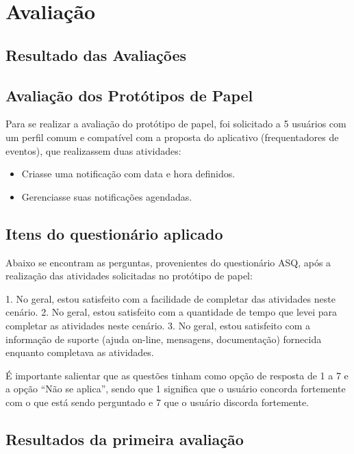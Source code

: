 \chapter{Avaliação}

  \section{Resultado das Avaliações}
  
     \section{Avaliação dos Protótipos de Papel}
     
     Para se realizar a avaliação do protótipo de papel, foi solicitado a 5 usuários com um perfil comum e compatível com a proposta do aplicativo 
  (frequentadores de eventos), que realizassem duas atividades:
  
  \begin{itemize}
       \item Criasse uma notificação com data e hora definidos.

       \item Gerenciasse suas notificações agendadas.
       
  \end{itemize}
     
        \section{Itens do questionário aplicado}
        
        Abaixo se encontram as perguntas, provenientes do questionário ASQ, após a realização das atividades solicitadas no protótipo de papel:
     
     1. No geral, estou satisfeito com a facilidade de completar das atividades neste cenário.
     2. No geral, estou satisfeito com a quantidade de tempo que levei para completar as atividades neste cenário.
     3. No geral, estou satisfeito com a informação de suporte (ajuda on-line, mensagens, documentação) fornecida enquanto completava as atividades.
     
     É importante salientar que as questões tinham como opção de resposta de 1 a 7 e a opção “Não se aplica”, sendo que 1 significa que o usuário concorda 
     fortemente com o que está sendo perguntado e 7 que o usuário discorda fortemente.
  
        \section{Resultados da primeira avaliação}
        
